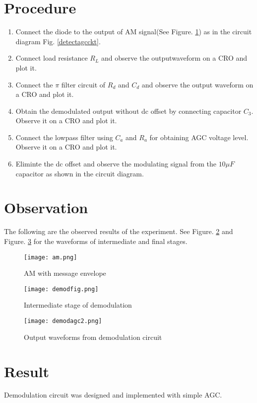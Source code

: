 \section*{Procedure}
\begin{enumerate}
\item
Connect the diode to the output of AM signal(See Figure. \ref{amenv}) as in the circuit diagram Fig. \ref{detectagcckt}.
\item
Connect load resistance $R_L$ and observe the outputwaveform on a CRO and plot it.
\item
Connect the $\pi$ filter circuit of $R_d$ and $C_d$ and observe the output waveform on a CRO and plot it.
\item
Obtain the demodulated output without dc offset by connecting capacitor $C_3$. Observe it on a CRO and plot it.
\item
Connect the lowpass filter using $C_a$ and $R_a$ for obtaining AGC voltage level. Observe it on a CRO and plot it.
\item
Eliminte the dc offset and observe the modulating signal from the $10\mu F$ capacitor as shown in the circuit diagram.
\end{enumerate}
\section*{Observation}
The following are the observed results of the experiment. See Figure. \ref{aminter} and Figure. \ref{demodagcwaves} for the waveforms of intermediate and final stages.
\begin{figure}
\texttt{[image: am.png]}
\caption{AM with message envelope}
\label{amenv}
\end{figure}
\begin{figure}
\texttt{[image: demodfig.png]}
\caption{Intermediate stage of demodulation}
\label{aminter}

\end{figure}
\begin{figure}
\texttt{[image: demodagc2.png]}
\caption{Output waveforms from demodulation circuit}
\label{demodagcwaves}
\end{figure}

\section*{Result}

Demodulation circuit was designed and implemented with simple AGC.
